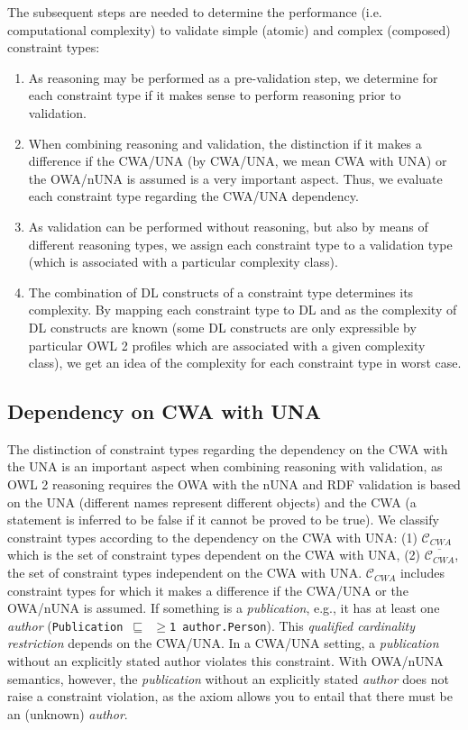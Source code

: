 \documentclass{llncs}
\newcommand{\ms}[1]{\texttt{#1}}
\newcommand{\er}[1]{\todo[size=\small, color=red!40]{\textbf{Erman:} #1}}
\begin{document}
The subsequent steps are needed to determine the performance (i.e. computational complexity) to validate simple (atomic) and complex (composed) constraint types:
\begin{enumerate}
	\item As reasoning may be performed as a pre-validation step, we determine for each constraint type if it makes sense to perform reasoning prior to validation.
	\item When combining reasoning and validation, the distinction if it makes a difference if the CWA/UNA (by CWA/UNA, we mean CWA with UNA) or the OWA/nUNA is assumed is a very important aspect. Thus, we evaluate each constraint type regarding the CWA/UNA dependency.
	\item As validation can be performed without reasoning, but also by means of different reasoning types, we assign each constraint type to a validation type (which is associated with a particular complexity class).
	\item The combination of DL constructs of a constraint type determines its complexity. By mapping each constraint type to DL and as the complexity of DL constructs are known (some DL constructs are only expressible by particular OWL 2 profiles which are associated with a given complexity class), we get an idea of the complexity for each constraint type in worst case.
\end{enumerate}

\subsection{Dependency on CWA with UNA}

The distinction of constraint types regarding the dependency on the CWA with the UNA is an important aspect when combining reasoning with validation,
as OWL 2 reasoning requires the OWA with the nUNA and RDF validation is based on the UNA (different names represent different objects) and
the CWA (a statement is inferred to be false if it cannot be proved to be true).
We classify constraint types according to the dependency on the CWA with UNA: (1) $\mathcal{C}_{CWA}$ which is  the set of constraint types dependent on the CWA with UNA, (2) $\overline{\mathcal{C}_{CWA}}$, the set of constraint types independent on the CWA with UNA.  $\mathcal{C}_{CWA}$ includes constraint types for which it makes a difference if the CWA/UNA or the OWA/nUNA is assumed.
If something is a \emph{publication}, e.g., it has at least one \emph{author} (\ms{Publication $\sqsubseteq$ $\geq$1 author.Person}).
This {\em qualified cardinality restriction} depends on the CWA/UNA.
In a CWA/UNA setting, a \emph{publication} without an explicitly stated author violates this constraint.  
With OWA/nUNA semantics, however,
the \emph{publication} without an explicitly stated \emph{author} does not raise a constraint violation, 
as the axiom allows you to entail that there must be an (unknown) \emph{author}.
\end{document}
